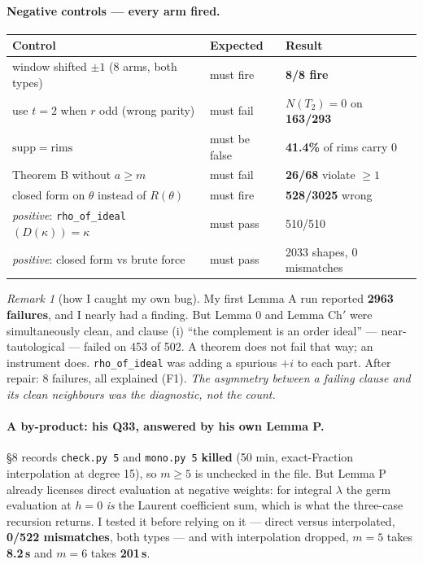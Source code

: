 \documentclass[11pt,a4paper]{article}
\theoremstyle{remark}
\newtheorem*{remark}{Remark}
\newcommand{\Dg}{D}
\begin{document}
\paragraph{Negative controls --- every arm fired.}
\begin{center}
\small
\begin{tabular}{p{5.0cm}p{2.6cm}p{5.2cm}}
\toprule
\textbf{Control} & \textbf{Expected} & \textbf{Result} \\
\midrule
window shifted $\pm1$ (8 arms, both types) & must fire & \textbf{8/8 fire} \\
use $t=2$ when $r$ odd (wrong parity) & must fail & $N(T_2)=0$ on \textbf{163/293} \\
$\mathrm{supp}=\mathrm{rims}$ & must be false & \textbf{41.4\%} of rims carry 0 \\
Theorem B without $a\ge m$ & must fail & \textbf{26/68} violate $\ge1$ \\
closed form on $\theta$ instead of $R(\theta)$ & must fire & \textbf{528/3025} wrong \\
\midrule
\emph{positive}: \texttt{rho\_of\_ideal}$(\Dg(\kappa))=\kappa$ & must pass & 510/510 \\
\emph{positive}: closed form vs brute force & must pass & 2033 shapes, 0 mismatches \\
\bottomrule
\end{tabular}
\end{center}

\begin{remark}[how I caught my own bug]
My first Lemma A run reported \textbf{2963 failures}, and I nearly had a finding. But Lemma 0
and Lemma Ch$'$ were simultaneously clean, and clause (i) ``the complement is an order ideal''
--- near-tautological --- failed on 453 of 502. A theorem does not fail that way; an instrument
does. \texttt{rho\_of\_ideal} was adding a spurious $+i$ to each part. After repair: 8 failures,
all explained (F1). \emph{The asymmetry between a failing clause and its clean neighbours was
the diagnostic, not the count.}
\end{remark}

\paragraph{A by-product: his Q33, answered by his own Lemma P.}
\S8 records \texttt{check.py 5} and \texttt{mono.py 5} \textbf{killed} (50 min, exact-Fraction
interpolation at degree 15), so $m\ge5$ is unchecked in the file. But Lemma P already licenses
direct evaluation at negative weights: for integral $\lambda$ the germ evaluation at $h=0$
\emph{is} the Laurent coefficient sum, which is what the three-case recursion returns. I tested
it before relying on it --- direct versus interpolated, \textbf{0/522 mismatches}, both types ---
and with interpolation dropped, $m=5$ takes \textbf{8.2\,s} and $m=6$ takes \textbf{201\,s}.
\end{document}

